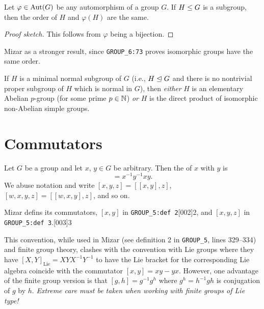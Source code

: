 \begin{theorem}\label{thm:pure-math:iso-subgroups-have-same-order}
  Let $\varphi\in\operatorname{Aut}(G)$ be any automorphism of a group $G$.
  If $H\leq G$ is a subgroup, then the order of $H$ and
  $\varphi(H)$ are the same.
\end{theorem}

\begin{proof}[Proof sketch]
This follows from $\varphi$ being a bijection.
\end{proof}

\begin{remark}
Mizar as a stronger result, since \verb#GROUP_6:73# proves isomorphic
groups have the same order.
\end{remark}

\begin{theorem}
  If $H$ is a minimal normal subgroup of $G$ (i.e., $H\trianglelefteq G$
  and there is no nontrivial proper subgroup of $H$ which is normal in
  $G$),
  then \emph{either} $H$ is an elementary Abelian $p$-group (for some
  prime $p\in\mathbb{N}$) \emph{or} $H$ is the direct product of isomorphic
  non-Abelian simple groups.
\end{theorem}

\section{Commutators}

\begin{definition}
  Let $G$ be a group and let $x$, $y\in G$ be arbitrary.
  Then the  of $x$ with $y$ is
  \begin{equation*}
    [x,y] = x^{-1}y^{-1}xy.
  \end{equation*}
  We abuse notation and write $[x,y,z] = [{[x,y]},z]$,
  $[w,x,y,z] = [{[w,x,y]},z]$, and so on.
\end{definition}

\begin{remark}
Mizar defins its commutators, $[x,y]$ in \verb#GROUP_5:def 2#[002]{2}, and
$[x,y,z]$ in \verb#GROUP_5:def 3#.[003]{3}
\end{remark}

\begin{remark}
This convention, while used in Mizar (see definition 2 in \verb#GROUP_5#,
lines 329--334) and finite group theory, clashes with the convention
with Lie groups where they have $[X,Y]_{\text{Lie}}=XYX^{-1}Y^{-1}$ to
have the Lie bracket for the corresponding Lie algebra coincide with the
commutator $[x,y] = xy - yx$. However, one advantage of the finite group
version is that $[g,h] = g^{-1}g^{h}$ where $g^{h}=h^{-1}gh$ is
conjugation of $g$ by $h$. \emph{Extreme care must be taken when working
with finite groups of Lie type!}
\end{remark}

